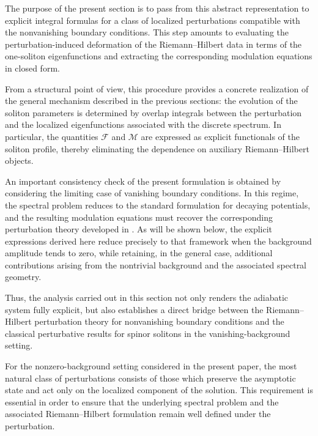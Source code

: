\documentclass[11pt]{amsart}
\theoremstyle{definition}
\numberwithin{equation}{section}
\begin{document}
The purpose of the present section is to pass from this abstract representation to explicit integral formulas for a class of localized perturbations compatible with the nonvanishing boundary conditions. This step amounts to evaluating the perturbation-induced deformation of the Riemann--Hilbert data in terms of the one-soliton eigenfunctions and extracting the corresponding modulation equations in closed form.

From a structural point of view, this procedure provides a concrete realization of the general mechanism described in the previous sections: the evolution of the soliton parameters is determined by overlap integrals between the perturbation and the localized eigenfunctions associated with the discrete spectrum. In particular, the quantities $\mathcal F$ and $\mathcal M$ are expressed as explicit functionals of the soliton profile, thereby eliminating the dependence on auxiliary Riemann--Hilbert objects.

An important consistency check of the present formulation is obtained by considering the limiting case of vanishing boundary conditions. In this regime, the spectral problem reduces to the standard formulation for decaying potentials, and the resulting modulation equations must recover the corresponding perturbation theory developed in \cite{Doktorov2008}. As will be shown below, the explicit expressions derived here reduce precisely to that framework when the background amplitude tends to zero, while retaining, in the general case, additional contributions arising from the nontrivial background and the associated spectral geometry.

Thus, the analysis carried out in this section not only renders the adiabatic system fully explicit, but also establishes a direct bridge between the Riemann--Hilbert perturbation theory for nonvanishing boundary conditions and the classical perturbative results for spinor solitons in the vanishing-background setting.

For the nonzero-background setting considered in the present paper, the most natural class of perturbations consists of those which preserve the asymptotic state and act only on the localized component of the solution. This requirement is essential in order to ensure that the underlying spectral problem and the associated Riemann--Hilbert formulation remain well defined under the perturbation.
\end{document}
